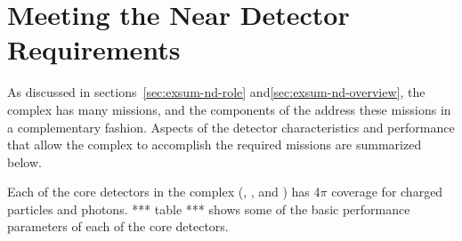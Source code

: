 


\section{Meeting the Near Detector Requirements}
\label{sec:exsum-nd-requirements}

As discussed in sections~\ref{sec:exsum-nd-role} and\ref{sec:exsum-nd-overview}, the    complex has many missions, and the components of the    address these missions in a complementary fashion. Aspects of the detector characteristics and performance that allow the   complex to accomplish the required missions are summarized below.  

Each of the core detectors in the   complex (, , and ) has 4$\pi$ coverage for charged particles and photons.  *** table *** shows some of the basic performance parameters of each of the core detectors.

